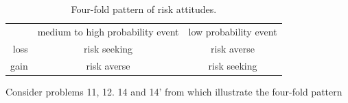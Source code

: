 \documentclass{article}\usepackage[]{graphicx}\usepackage[]{color}
\begin{document}
\begin{table}[h]
\caption{Four-fold pattern of risk attitudes.}
\centering
\begin{tabular}{ r|c|c| }
\multicolumn{1}{r}{}
 &  \multicolumn{1}{c}{medium to high probability event}
 & \multicolumn{1}{c}{low probability event} \\
\cline{2-3}
loss & risk seeking & risk averse \\
\cline{2-3}
gain & risk averse & risk seeking \\
\cline{2-3}
\end{tabular}
\label{four_fold_table}
\end{table}

Consider problems 11, 12. 14 and 14' from \citet[][p. 273, 281]{Kahneman_Tversky_1979} which illustrate the four-fold pattern
\end{document}
